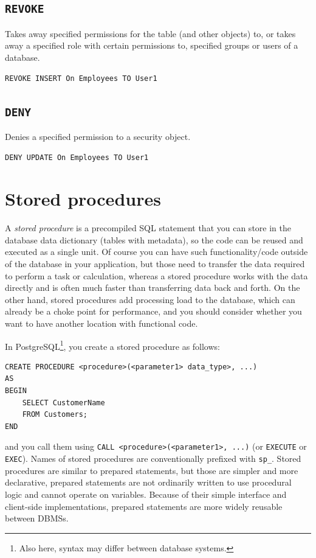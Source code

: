 \documentclass[table, xcdraw]{article}%
\begin{document}
\subsection{\texttt{REVOKE}}

Takes away specified permissions for the table (and other objects) to, or takes away a specified role with certain permissions to, specified groups or users of a database.

\begin{verbatim}
REVOKE INSERT On Employees TO User1
\end{verbatim}

\subsection{\texttt{DENY}}

Denies a specified permission to a security object.

\begin{verbatim}
DENY UPDATE On Employees TO User1
\end{verbatim}

\section{Stored procedures}

A \emph{stored procedure} is a precompiled SQL statement that you can store in the database data dictionary (tables with metadata), so the code can be reused and executed as a single unit. Of course you can have such functionality/code outside of the database in your application, but those need to transfer the data required to perform a task or calculation, whereas a stored procedure works with the data directly and is often much faster than transferring data back and forth. On the other hand, stored procedures add processing load to the database, which can already be a choke point for performance, and you should consider whether you want to have another location with functional code.

In PostgreSQL\footnote{Also here, syntax may differ between database systems.}, you create a stored procedure as follows:

\begin{verbatim}
CREATE PROCEDURE <procedure>(<parameter1> data_type>, ...)
AS
BEGIN
    SELECT CustomerName
    FROM Customers;
END
\end{verbatim}

and you call them using \texttt{CALL <procedure>(<parameter1>, ...)} (or \texttt{EXECUTE} or \texttt{EXEC}). Names of stored procedures are conventionally prefixed with \texttt{sp_}.
Stored procedures are similar to prepared statements, but those are simpler and more declarative, prepared statements are not ordinarily written to use procedural logic and cannot operate on variables. Because of their simple interface and client-side implementations, prepared statements are more widely reusable between DBMSs.
\end{document}
